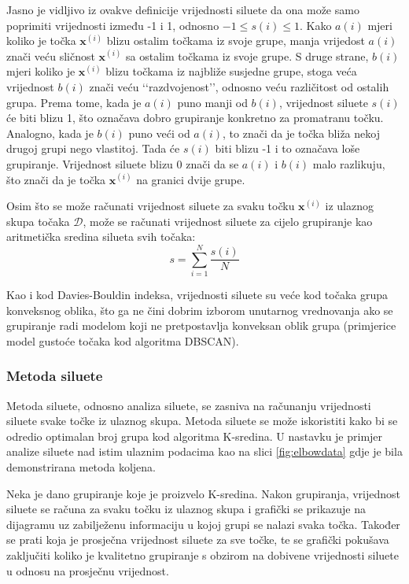\documentclass[times, utf8, zavrsni]{fer}
\begin{document}
Jasno je vidljivo iz ovakve definicije vrijednosti siluete da ona može samo poprimiti vrijednosti između -1 i 1, odnosno $-1 \leq s (i) \leq 1$. Kako $a (i)$ mjeri koliko je točka $\mathbf{x}^{(i)}$ blizu ostalim točkama iz svoje grupe, manja vrijedost $a(i)$ znači veću sličnost $\mathbf{x}^{(i)}$ sa ostalim točkama iz svoje grupe. S druge strane, $b(i)$ mjeri koliko je $\mathbf{x}^{(i)}$ blizu točkama iz najbliže susjedne grupe, stoga veća vrijednost $b (i)$ znači veću ‘‘razdvojenost’’, odnosno veću različitost od ostalih grupa. Prema tome, kada je $a(i)$ puno manji od $b(i)$, vrijednost siluete $s (i)$ će biti blizu 1, što označava dobro grupiranje konkretno za promatranu točku. Analogno, kada je $b (i)$ puno veći od $a (i)$, to znači da je točka bliža nekoj drugoj grupi nego vlastitoj. Tada će $s(i)$ biti blizu -1 i to označava loše grupiranje. Vrijednost siluete blizu 0 znači da se $a(i)$ i $b(i)$ malo razlikuju, što znači da je točka $\mathbf{x}^{(i)}$ na granici dvije grupe.

Osim što se može računati vrijednost siluete za svaku točku $\mathbf{x}^{(i)}$ iz ulaznog skupa točaka $\mathcal{D}$, može se računati vrijednost siluete za cijelo grupiranje kao aritmetička sredina silueta svih točaka:
\[s = \sum_{i=1}^{N} \frac{s (i)}{N}\]

Kao i kod Davies-Bouldin indeksa, vrijednosti siluete su veće kod točaka grupa konveksnog oblika, što ga ne čini dobrim izborom unutarnog vrednovanja ako se grupiranje radi modelom koji ne pretpostavlja konveksan oblik grupa (primjerice model gustoće točaka kod algoritma DBSCAN).

\subsubsection{Metoda siluete}
Metoda siluete, odnosno analiza siluete, se zasniva na računanju vrijednosti siluete svake točke iz ulaznog skupa. Metoda siluete se može iskoristiti kako bi se odredio optimalan broj grupa kod algoritma K-sredina. U nastavku je primjer analize siluete nad istim ulaznim podacima kao na slici \ref{fig:elbowdata} gdje je bila demonstrirana metoda koljena.

Neka je dano grupiranje koje je proizvelo K-sredina. Nakon grupiranja, vrijednost siluete se računa za svaku točku iz ulaznog skupa i grafički se prikazuje na dijagramu uz zabilježenu informaciju u kojoj grupi se nalazi svaka točka. Također se prati koja je prosječna vrijednost siluete za sve točke, te se grafički pokušava zaključiti koliko je kvalitetno grupiranje s obzirom na dobivene vrijednosti siluete u odnosu na prosječnu vrijednost.
\end{document}
